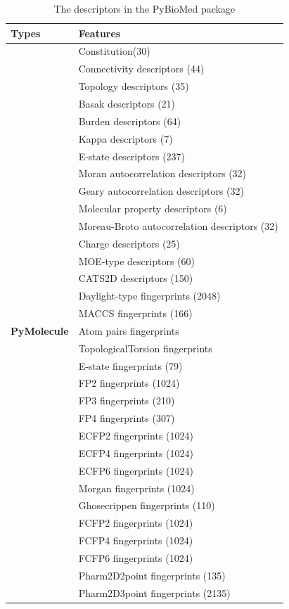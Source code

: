 \documentclass[letterpaper,10pt,english]{sphinxmanual}
\begin{document}
\begin{longtable}{| p{2.5cm}<{\centering} | p{10cm} |}
	\caption{The descriptors in the PyBioMed package }
	\hline
	\textbf{\large{Types}} & \centerline{\textbf{\large{Features}}} \\
	\hline
	& Constitution(30) \\
	& Connectivity descriptors (44) \\
	& Topology descriptors (35) \\
	& Basak descriptors (21) \\
	& Burden descriptors (64) \\
	& Kappa descriptors (7) \\
	& E-state descriptors (237) \\
	& Moran autocorrelation descriptors (32) \\
	& Geary autocorrelation descriptors (32) \\
	& Molecular property descriptors (6) \\
	& Moreau-Broto autocorrelation descriptors (32) \\
	& Charge descriptors (25) \\
	& MOE-type descriptors (60) \\
	& CATS2D descriptors (150) \\
	& Daylight-type fingerprints (2048)\\
	& MACCS fingerprints (166)\\
	\textbf{PyMolecule} & Atom pairs fingerprints \\
	& TopologicalTorsion fingerprints \\
	& E-state fingerprints (79)\\
	& FP2 fingerprints (1024)\\
	& FP3 fingerprints (210)\\
	& FP4 fingerprints (307)\\
	& ECFP2 fingerprints (1024)\\
	& ECFP4 fingerprints (1024)\\
	& ECFP6 fingerprints (1024)\\
	& Morgan fingerprints (1024)\\
	& Ghosecrippen fingerprints (110)\\
	& FCFP2 fingerprints (1024)\\
	& FCFP4 fingerprints (1024)\\
	& FCFP6 fingerprints (1024)\\
	& Pharm2D2point fingerprints (135)\\
	& Pharm2D3point fingerprints (2135)\\\hline
	

\end{longtable}
\end{document}
